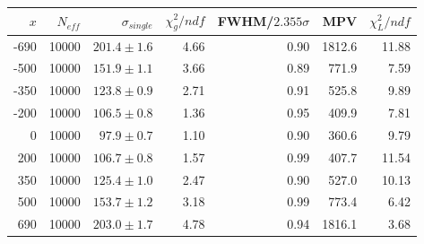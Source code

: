 \begin{tabular}{rrrrrrr}\toprule
$x$ & $N_{eff}$ & $\sigma_{single}$ & $\chi^2_g/ndf$ & FWHM/$2.355\sigma$ & MPV & $\chi^2_L/ndf$\\\midrule
-690 & 10000 & $201.4\pm1.6$ & 4.66 & 0.90 & 1812.6 & 11.88\\
-500 & 10000 & $151.9\pm1.1$ & 3.66 & 0.89 & 771.9 & 7.59\\
-350 & 10000 & $123.8\pm0.9$ & 2.71 & 0.91 & 525.8 & 9.89\\
-200 & 10000 & $106.5\pm0.8$ & 1.36 & 0.95 & 409.9 & 7.81\\
0 & 10000 & $97.9\pm0.7$ & 1.10 & 0.90 & 360.6 & 9.79\\
200 & 10000 & $106.7\pm0.8$ & 1.57 & 0.99 & 407.7 & 11.54\\
350 & 10000 & $125.4\pm1.0$ & 2.47 & 0.90 & 527.0 & 10.13\\
500 & 10000 & $153.7\pm1.2$ & 3.18 & 0.99 & 773.4 & 6.42\\
690 & 10000 & $203.0\pm1.7$ & 4.78 & 0.94 & 1816.1 & 3.68\\
\bottomrule\end{tabular}
